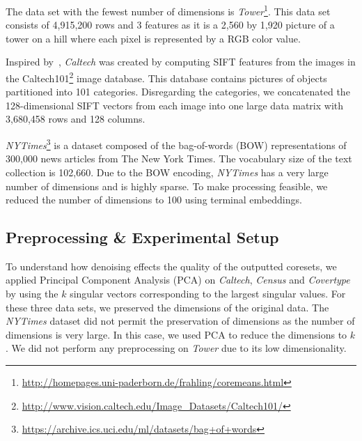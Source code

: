 The data set with the fewest number of dimensions is \textit{Tower}\footnote{\url{http://homepages.uni-paderborn.de/frahling/coremeans.html}}. This data set consists of 4,915,200 rows and 3 features as it is a 2,560 by 1,920 picture of a tower on a hill where each pixel is represented by a RGB color value. 



Inspired by~\cite{FGSSS13}, \textit{Caltech} was created by computing SIFT features from the images in the Caltech101\footnote{\url{http://www.vision.caltech.edu/Image_Datasets/Caltech101/}} image database. This database contains pictures of objects partitioned into 101 categories. Disregarding the categories, we concatenated the 128-dimensional SIFT vectors from each image into one large data matrix with 3,680,458 rows and 128 columns. 

\textit{NYTimes}\footnote{\url{https://archive.ics.uci.edu/ml/datasets/bag+of+words}} is a dataset composed of the bag-of-words (BOW) representations of 300,000 news articles from The New York Times. The vocabulary size of the text collection is 102,660. Due to the BOW encoding, \textit{NYTimes} has a very large number of dimensions and is highly sparse. To make processing feasible, we reduced the number of dimensions to 100 using terminal embeddings.

\subsection{Preprocessing \& Experimental Setup}
To understand how denoising effects the quality of the outputted coresets, we applied Principal Component Analysis (PCA) on \textit{Caltech}, \textit{Census} and \textit{Covertype} by using the $k$ singular vectors corresponding to the largest singular values. For these three data sets, we preserved the dimensions of the original data.  
The \textit{NYTimes} dataset did not permit the preservation of dimensions as the number of dimensions is very large. In this case, we used PCA to reduce the dimensions to $k$.
We did not perform any preprocessing on \textit{Tower} due to its low dimensionality.

